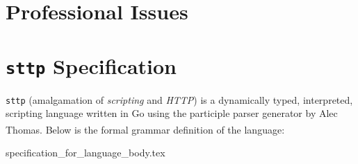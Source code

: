 \documentclass[]{full}
\theoremstyle{definition}
\begin{document}
\chapter{Professional Issues}
\label{chap:professional-issues}


\appendix

\cprotect\chapter{\verb|sttp| Specification}
\label{appendix:sttp-specification}

\verb|sttp| (amalgamation of \textit{scripting} and \textit{HTTP}) is a dynamically typed, interpreted, scripting language written in Go using the participle parser generator by Alec Thomas\textsuperscript{\cite{thomas_2021}}. Below is the formal grammar definition of the language:

{specification_for_language_body.tex}

\newpage
\label{endpage}

\printbibliography
\end{document}
